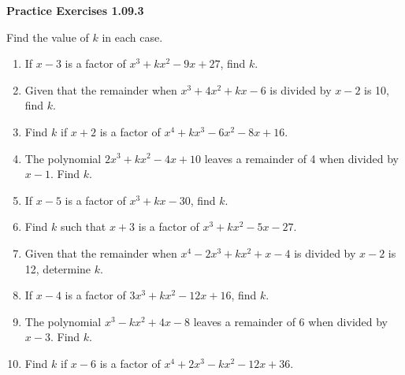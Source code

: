 \vspace{0.3ex}
\noindent\textbf{Practice Exercises 1.09.3}

\vspace{0.2ex}

Find the value of \( k \) in each case.
\begin{enumerate}
    \item If \( x - 3 \) is a factor of \( x^3 + kx^2 - 9x + 27 \), find \( k \).
    \item Given that the remainder when \( x^3 + 4x^2 + kx - 6 \) is divided by \( x - 2 \) is 10, find \( k \).
    \item Find \( k \) if \( x + 2 \) is a factor of \( x^4 + kx^3 - 6x^2 - 8x + 16 \).
    \item The polynomial \( 2x^3 + kx^2 - 4x + 10 \) leaves a remainder of 4 when divided by \( x - 1 \). Find \( k \).
    \item If \( x - 5 \) is a factor of \( x^3 + kx - 30 \), find \( k \).
    \item Find \( k \) such that \( x + 3 \) is a factor of \( x^3 + kx^2 - 5x - 27 \).
    \item Given that the remainder when \( x^4 - 2x^3 + kx^2 + x - 4 \) is divided by \( x - 2 \) is 12, determine \( k \).
    \item If \( x - 4 \) is a factor of \( 3x^3 + kx^2 - 12x + 16 \), find \( k \).
    \item The polynomial \( x^3 - kx^2 + 4x - 8 \) leaves a remainder of \( 6 \) when divided by \( x - 3 \). Find \( k \).
    \item Find \( k \) if \( x - 6 \) is a factor of \( x^4 + 2x^3 - kx^2 - 12x + 36 \).
\end{enumerate}
